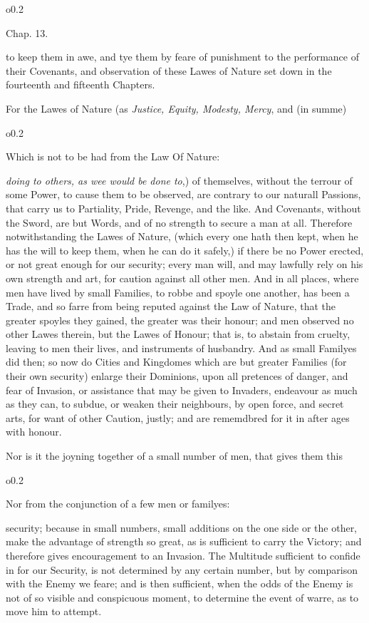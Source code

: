 
\noindent\begin{wrapfigure}[2]{o}{0.2\textwidth}\raggedright Chap. 13.
\end{wrapfigure} to keep them in awe, and tye them by feare of
punishment to the performance of their Covenants, and observation of
these Lawes of Nature set down in the fourteenth and fifteenth
Chapters.

For the Lawes of Nature (as \textit{Justice, Equity, Modesty, Mercy},
and (in summe) \begin{wrapfigure}[4]{o}{0.2\textwidth}\raggedright
Which is not to be had from the Law Of Nature: \end{wrapfigure}
\textit{doing to others, as wee would be done to},) of themselves,
without the terrour of some Power, to cause them to be observed, are
contrary to our naturall Passions, that carry us to Partiality, Pride,
Revenge, and the like. And Covenants, without the Sword, are but
Words, and of no strength to secure a man at all. Therefore
notwithstanding the Lawes of Nature, (which every one hath then kept,
when he has the will to keep them, when he can do it safely,) if there
be no Power erected, or not great enough for our security; every man
will, and may lawfully rely on his own strength and art, for caution
against all other men. And in all places,  where men have
lived by small Families, to robbe and spoyle one another, has been a
Trade, and so farre from being reputed against the Law of Nature, that
the greater spoyles they gained, the greater was their honour; and men
observed no other Lawes therein, but the Lawes of Honour; that is, to
abstain from cruelty, leaving to men their lives, and instruments of
husbandry. And as small Familyes did then; so now do Cities and
Kingdomes which are but greater Families (for their own security)
enlarge their Dominions, upon all pretences of danger, and fear of
Invasion, or assistance that may be given to Invaders, endeavour as
much as they can, to subdue, or weaken their neighbours, by open
force, and secret arts, for want of other Caution, justly; and are
rememdbred for it in after ages with honour.

Nor is it the joyning together of a small number of men, that gives
them this \begin{wrapfigure}[5]{o}{0.2\textwidth}\raggedright Nor from
the conjunction of a few men or familyes: \end{wrapfigure} security;
because in small numbers, small additions on the one side or the
other, make the advantage of strength so great, as is sufficient to
carry the Victory; and therefore gives encouragement to an Invasion.
The Multitude sufficient to confide in for our Security, is not
determined by any certain number, but by comparison with the Enemy we
feare; and is then sufficient, when the odds of the Enemy is not of so
visible and conspicuous moment, to determine the event of warre, as to
move him to attempt.

